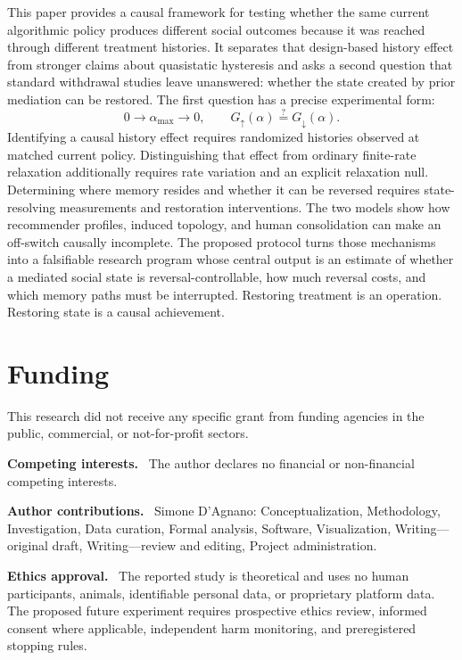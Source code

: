 \documentclass[10pt,a4paper]{article}
\newcommand{\alphamax}{\alpha_{\max}}
\newcommand{\Gup}{G_{\uparrow}}
\newcommand{\Gdown}{G_{\downarrow}}
\newcommand{\inlinehead}[1]{\par\smallskip\noindent\textbf{#1}\ }
\begin{document}
This paper provides a causal framework for testing whether the same current algorithmic policy produces different social outcomes because it was reached through different treatment histories. It separates that design-based history effect from stronger claims about quasistatic hysteresis and asks a second question that standard withdrawal studies leave unanswered: whether the state created by prior mediation can be restored. The first question has a precise experimental form:
\begin{equation}
0\rightarrow\alphamax\rightarrow0,
\qquad
\Gup(\alpha)\stackrel{?}{=}\Gdown(\alpha).
\end{equation}
Identifying a causal history effect requires randomized histories observed at matched current policy. Distinguishing that effect from ordinary finite-rate relaxation additionally requires rate variation and an explicit relaxation null. Determining where memory resides and whether it can be reversed requires state-resolving measurements and restoration interventions. The two models show how recommender profiles, induced topology, and human consolidation can make an off-switch causally incomplete. The proposed protocol turns those mechanisms into a falsifiable research program whose central output is an estimate of whether a mediated social state is reversal-controllable, how much reversal costs, and which memory paths must be interrupted. Restoring treatment is an operation. Restoring state is a causal achievement.

\section*{Funding} This research did not receive any specific grant from funding agencies in the public, commercial, or not-for-profit sectors.

\inlinehead{Competing interests.} The author declares no financial or non-financial competing interests.

\inlinehead{Author contributions.} Simone D'Agnano: Conceptualization, Methodology, Investigation, Data curation, Formal analysis, Software, Visualization, Writing---original draft, Writing---review and editing, Project administration.

\inlinehead{Ethics approval.} The reported study is theoretical and uses no human participants, animals, identifiable personal data, or proprietary platform data. The proposed future experiment requires prospective ethics review, informed consent where applicable, independent harm monitoring, and preregistered stopping rules.
\end{document}
